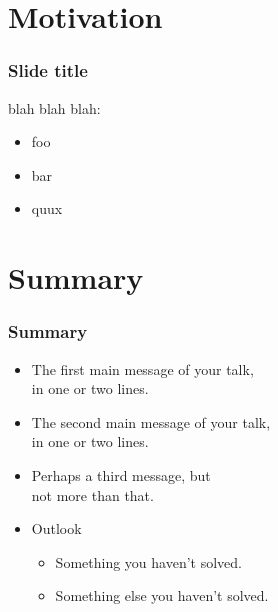 

\section{Motivation}

\begin{frame}
  \frametitle{Slide title}

  blah blah blah:
  \begin{itemize}[<+->]
  \item foo
  \item bar
  \item quux
  \end{itemize}

\end{frame}


\section*{Summary}

\begin{frame}
  \frametitle<presentation>{Summary}
  \begin{itemize}
  \item The \alert{first main message} of your talk, \\
    in one or two lines.
  \item The \alert{second main message} of your talk, \\
    in one or two lines.
  \item Perhaps a \alert{third message}, but \\
    not more than that.
  \end{itemize}
  
  \begin{itemize}
  \item Outlook
    \begin{itemize}
    \item Something you haven't solved.
    \item Something else you haven't solved.
    \end{itemize}
  \end{itemize}
\end{frame}



